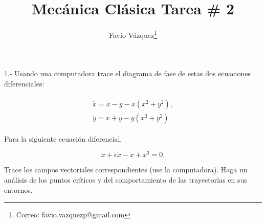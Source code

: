 \documentclass[a4paper,10pt]{article}
\title{Mecánica Clásica Tarea \# 2}
\author{Favio Vázquez\thanks{Correo: favio.vazquezp@gmail.com}}\affil{Instituto de Física. Universidad Nacional Autónoma de México}
\date{}
\begin{document}
\makeatletter
\def\@maketitle{%
  \newpage
  \null
  \vskip 2em%
  \begin{center}%
  \let \footnote \thanks
    {\Large\bfseries \@title \par}%
    \vskip 1.5em%
    {\normalsize
      \lineskip .5em%
      \begin{tabular}[t]{c}%
        \@author
      \end{tabular}\par}%
    \vskip 1em%
    {\normalsize \@date}%
  \end{center}%
  \par
  \vskip 1.5em}
\makeatother

\maketitle

 
 
\lstset{style=mystyle}

1.- Usando una computadora trace el diagrama de fase de estas dos ecuaciones diferenciales:

\begin{gather*}
 \begin{split}
\dot{x} = x - y - x(x^2+y^2), \\
\dot{y} = x + y - y(x^2+y^2).
 \end{split}
\end{gather*}


Para la siguiente ecuación diferencial, 

$$
\ddot{x} + \epsilon \dot{x} - x + x^3 = 0.
$$

Trace los campos vectoriales correspondientes (use la computadora). Haga un análisis de los 
puntos críticos y del comportamiento de las trayectorias en sus entornos.
\end{document}
